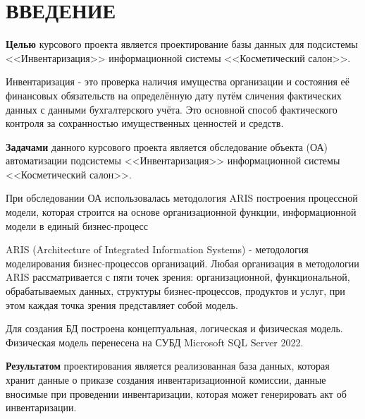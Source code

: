 {}
\section*{ВВЕДЕНИЕ}


\textbf{Целью} курсового проекта является проектирование базы данных для подсистемы <<Инвентаризация>> информационной системы <<Косметический салон>>.

Инвентаризация - это проверка наличия имущества организации и состояния
её финансовых обязательств на определённую дату путём сличения фактических данных
с данными бухгалтерского учёта.
Это основной способ фактического контроля за сохранностью имущественных ценностей и средств.

\textbf{Задачами} данного курсового проекта является обследование объекта (ОА) автоматизации подсистемы <<Инвентаризация>> информационной системы <<Косметический салон>>.

При обследовании ОА использовалась методология ARIS построения процессной модели, которая строится на основе организационной функции,
информационной модели в единый бизнес-процесс

ARIS (Architecture of Integrated Information Systems) - методология моделирования бизнес-процессов организаций.
Любая организация в методологии ARIS рассматривается с пяти точек зрения:
организационной, функциональной, обрабатываемых данных, структуры бизнес-процессов,
продуктов и услуг, при этом каждая точка зрения представляет собой модель.

Для создания БД построена концептуальная, логическая и физическая модель. Физическая модель перенесена на СУБД Microsoft SQL Server 2022.


\textbf{Результатом} проектирования является реализованная база данных, которая хранит данные о приказе создания инвентаризационной комиссии,
данные вносимые при проведении инвентаризации, которая может генерировать акт об инвентаризации.

